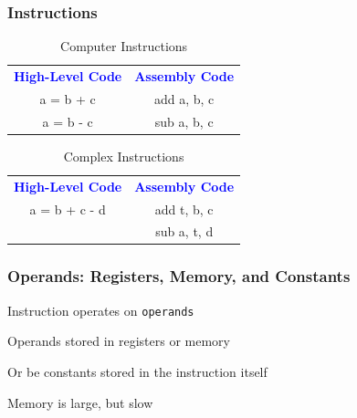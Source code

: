 \documentclass[xcolor={table, dvipsnames}]{beamer}
\newcommand\boldblue[1]{\textcolor{blue}{\textbf{#1}}}
\begin{document}
\begin{frame}
\frametitle{Instructions}

\begin{table}[h!]
\centering
 \begin{tabular}{| c c |} 
\hline
 \boldblue{High-Level Code}  & \boldblue{Assembly Code}   \\ 
 a = b + c & add a, b, c \\ 
 a = b - c & sub a, b, c \\ 
 \hline
\end{tabular}
\caption{Computer Instructions} \pause
\end{table}

\begin{table}[h!]
 \begin{tabular}{| c c |} 
\hline
 \boldblue{High-Level Code}  & \boldblue{Assembly Code}   \\ 
 a = b + c - d & add t, b, c \\ 
   & sub a, t, d \\ 
 \hline
\end{tabular}
\caption{Complex Instructions} 
\end{table}
\end{frame}

\begin{frame}
\frametitle{Operands: Registers, Memory, and Constants}
Instruction operates on \texttt{operands} \newline \pause

Operands stored in registers or memory \newline \pause

Or be constants stored in the instruction itself \newline \pause

Memory is large, but slow
\end{frame}
\end{document}
